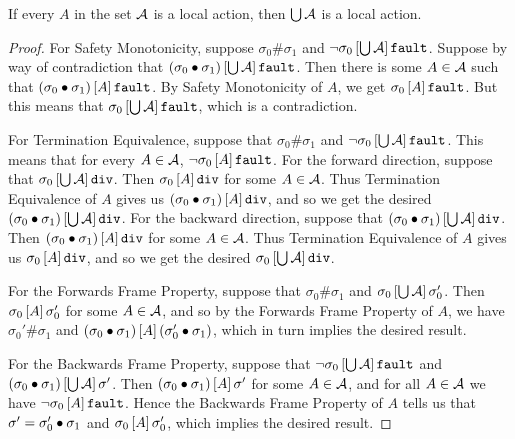 \begin{lem}
If every $A$ in the set $\A$ is a local action, then $\bigcup \A$ is a local action.
\end{lem}

\ifextended
\begin{proof}
For Safety Monotonicity, suppose $\sigma_0 \# \sigma_1$ and 
$\lnot \relatebr{\bigcup \A}{\sigma_0}{\fault}$. Suppose by way
of contradiction that $\relatebr{\bigcup \A}{(\sigma_0 \dt \sigma_1)}{\fault}$. Then there is some $A \in \A$ such that
$\relatebr{A}{(\sigma_0 \dt \sigma_1)}{\fault}$. By Safety Monotonicity of $A$, we get $\relatebr{A}{\sigma_0}{\fault}$.
But this means that $\relatebr{\bigcup \A}{\sigma_0}{\fault}$, which is a contradiction.

For Termination Equivalence, suppose that $\sigma_0 \# \sigma_1$ and $\lnot \relatebr{\bigcup \A}{\sigma_0}{\fault}$.
This means that for every $A \in \A$, $\lnot \relatebr{A}{\sigma_0}{\fault}$. For the forward direction, suppose that 
$\relatebr{\bigcup \A}{\sigma_0}{\dvg}$. Then $\relatebr{A}{\sigma_0}{\dvg}$ for some $A \in \A$. Thus 
Termination Equivalence of $A$ gives us $\relatebr{A}{(\sigma_0 \dt \sigma_1)}{\dvg}$, and so we get the desired
$\relatebr{\bigcup \A}{(\sigma_0 \dt \sigma_1)}{\dvg}$. For the backward direction, suppose that 
$\relatebr{\bigcup \A}{(\sigma_0 \dt \sigma_1)}{\dvg}$. Then $\relatebr{A}{(\sigma_0 \dt \sigma_1)}{\dvg}$ for some $A \in \A$. Thus 
Termination Equivalence of $A$ gives us $\relatebr{A}{\sigma_0}{\dvg}$, and so we get the desired
$\relatebr{\bigcup \A}{\sigma_0}{\dvg}$.

For the Forwards Frame Property, suppose that $\sigma_0 \# \sigma_1$ and $\relatebr{\bigcup \A}{\sigma_0}{\sigma_0'}$.
Then $\relatebr{A}{\sigma_0}{\sigma_0'}$ for some $A \in \A$, and so by the Forwards Frame Property of $A$, we have
$\sigma_0' \# \sigma_1$ and $\relatebr{A}{(\sigma_0 \dt \sigma_1)}{(\sigma_0' \dt \sigma_1)}$, which in turn
implies the desired result.

For the Backwards Frame Property, suppose that $\lnot \relatebr{\bigcup \A}{\sigma_0}{\fault}$ and
$\relatebr{\bigcup \A}{(\sigma_0 \dt \sigma_1)}{\sigma'}$. Then $\relatebr{A}{(\sigma_0 \dt \sigma_1)}{\sigma'}$
for some $A \in \A$, and for all $A \in \A$ we have $\lnot \relatebr{A}{\sigma_0}{\fault}$. Hence the
Backwards Frame Property of $A$ tells us that $\sigma' = \sigma_0' \dt \sigma_1$ and 
$\relatebr{A}{\sigma_0}{\sigma_0'}$, which implies the desired result.
\end{proof}
\fi

